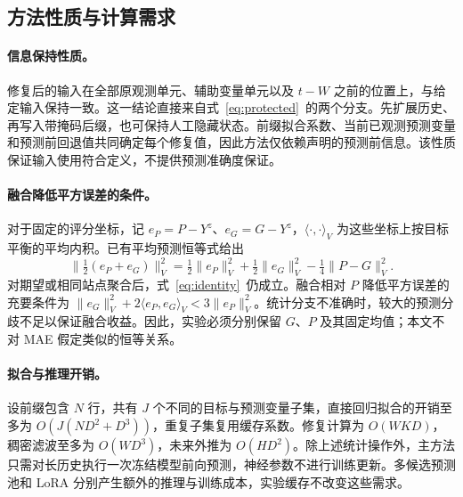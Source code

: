 \subsection{方法性质与计算需求}
\label{sec:properties}

\paragraph{信息保持性质。}
修复后的输入在全部原观测单元、辅助变量单元以及 $t-W$ 之前的位置上，与给定输入保持一致。这一结论直接来自式~\eqref{eq:protected}~的两个分支。先扩展历史、再写入带掩码后缀，也可保持人工隐藏状态。前缀拟合系数、当前已观测预测变量和预测前回退值共同确定每个修复值，因此方法仅依赖声明的预测前信息。该性质保证输入使用符合定义，不提供预测准确度保证。

\paragraph{融合降低平方误差的条件。}
对于固定的评分坐标，记 $e_P=P-Y^z$、$e_G=G-Y^z$，$\langle\cdot,\cdot\rangle_V$ 为这些坐标上按目标平衡的平均内积。已有平均预测恒等式给出
\begin{equation}
 \|\tfrac12(e_P+e_G)\|_V^2
 =\tfrac12\|e_P\|_V^2+\tfrac12\|e_G\|_V^2
 -\tfrac14\|P-G\|_V^2.
 \label{eq:identity}
\end{equation}
对期望或相同站点聚合后，式~\eqref{eq:identity}~仍成立。融合相对 $P$ 降低平方误差的充要条件为 $\|e_G\|_V^2+2\langle e_P,e_G\rangle_V<3\|e_P\|_V^2$。统计分支不准确时，较大的预测分歧不足以保证融合收益。因此，实验必须分别保留 $G$、$P$ 及其固定均值；本文不对 MAE 假定类似的恒等关系。

\paragraph{拟合与推理开销。}
设前缀包含 $N$ 行，共有 $J$ 个不同的目标与预测变量子集，直接回归拟合的开销至多为 $O(J(ND^2+D^3))$，重复子集复用缓存系数。修复计算为 $O(WKD)$，稠密滤波至多为 $O(WD^3)$，未来外推为 $O(HD^2)$。除上述统计操作外，主方法只需对长历史执行一次冻结模型前向预测，神经参数不进行训练更新。多候选预测池和 LoRA 分别产生额外的推理与训练成本，实验缓存不改变这些需求。
